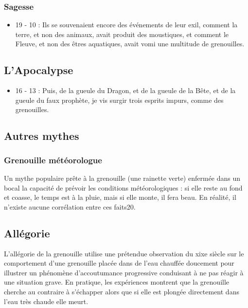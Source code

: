 \subsubsection{Sagesse}
\begin{itemize}
\item 19 - 10 : Ils se souvenaient encore des événements de leur exil, comment la terre, et non des animaux, avait produit des moustiques, et comment le Fleuve, et non des êtres aquatiques, avait vomi une multitude de grenouilles.
\end{itemize}
\subsection{L'Apocalypse}
\begin{itemize}
\item 16 - 13 : Puis, de la gueule du Dragon, et de la gueule de la Bête, et de la gueule du faux prophète, je vis surgir trois esprits impurs, comme des grenouilles.
\end{itemize}
\subsection{Autres mythes}
\subsubsection{Grenouille météorologue}
Un mythe populaire prête à la grenouille (une rainette verte) enfermée dans un bocal la capacité de prévoir les conditions météorologiques : si elle reste au fond et coasse, le temps est à la pluie, mais si elle monte, il fera beau. En réalité, il n'existe aucune corrélation entre ces faits20.
\subsection{Allégorie}
L'allégorie de la grenouille utilise une prétendue observation du xixe siècle sur le comportement d'une grenouille placée dans de l'eau chauffée doucement pour illustrer un phénomène d'accoutumance progressive conduisant à ne pas réagir à une situation grave. En pratique, les expériences montrent que la grenouille cherche au contraire à s'échapper alors que si elle est plongée directement dans l'eau très chaude elle meurt.
